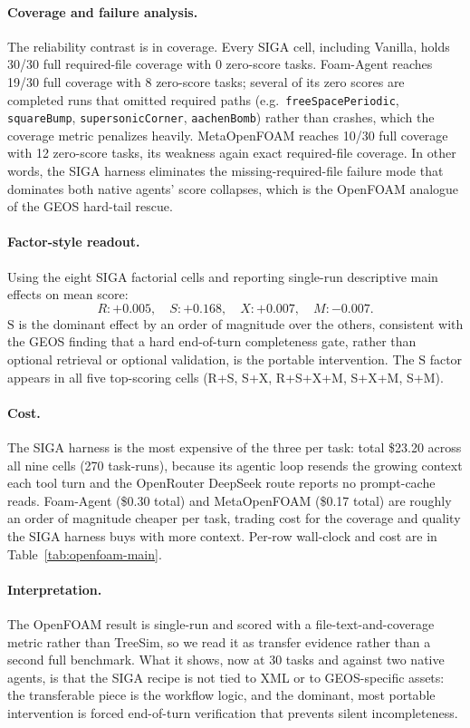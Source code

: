 \documentclass{article}
\begin{document}
\paragraph{Coverage and failure analysis.}
The reliability contrast is in coverage. Every SIGA cell, including Vanilla, holds 30/30 full required-file coverage with 0 zero-score tasks. Foam-Agent reaches 19/30 full coverage with 8 zero-score tasks; several of its zero scores are completed runs that omitted required paths (e.g.\ \texttt{freeSpacePeriodic}, \texttt{squareBump}, \texttt{supersonicCorner}, \texttt{aachenBomb}) rather than crashes, which the coverage metric penalizes heavily. MetaOpenFOAM reaches 10/30 full coverage with 12 zero-score tasks, its weakness again exact required-file coverage. In other words, the SIGA harness eliminates the missing-required-file failure mode that dominates both native agents' score collapses, which is the OpenFOAM analogue of the GEOS hard-tail rescue.

\paragraph{Factor-style readout.}
Using the eight SIGA factorial cells and reporting single-run descriptive main effects on mean score:
\[
R: +0.005,\quad
S: +0.168,\quad
X: +0.007,\quad
M: -0.007.
\]
$\mathrm{S}$ is the dominant effect by an order of magnitude over the others, consistent with the GEOS finding that a hard end-of-turn completeness gate, rather than optional retrieval or optional validation, is the portable intervention. The $\mathrm{S}$ factor appears in all five top-scoring cells (R+S, S+X, R+S+X+M, S+X+M, S+M).

\paragraph{Cost.}
The SIGA harness is the most expensive of the three per task: total \$23.20 across all nine cells (270 task-runs), because its agentic loop resends the growing context each tool turn and the OpenRouter DeepSeek route reports no prompt-cache reads. Foam-Agent (\$0.30 total) and MetaOpenFOAM (\$0.17 total) are roughly an order of magnitude cheaper per task, trading cost for the coverage and quality the SIGA harness buys with more context. Per-row wall-clock and cost are in Table~\ref{tab:openfoam-main}.

\paragraph{Interpretation.}
The OpenFOAM result is single-run and scored with a file-text-and-coverage metric rather than TreeSim, so we read it as transfer evidence rather than a second full benchmark. What it shows, now at 30 tasks and against two native agents, is that the SIGA recipe is not tied to XML or to GEOS-specific assets: the transferable piece is the workflow logic, and the dominant, most portable intervention is forced end-of-turn verification that prevents silent incompleteness.
\end{document}
